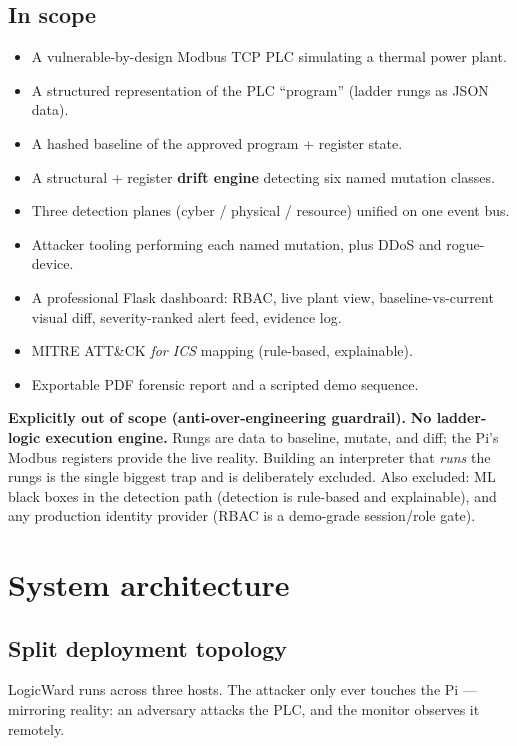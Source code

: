 \documentclass[11pt,a4paper]{article}
\begin{document}
\subsection{In scope}
\begin{itemize}[leftmargin=1.4em,itemsep=1pt]
  \item A vulnerable-by-design Modbus TCP PLC simulating a thermal power plant.
  \item A structured representation of the PLC ``program'' (ladder rungs as JSON data).
  \item A hashed baseline of the approved program + register state.
  \item A structural + register \textbf{drift engine} detecting six named mutation classes.
  \item Three detection planes (cyber / physical / resource) unified on one event bus.
  \item Attacker tooling performing each named mutation, plus DDoS and rogue-device.
  \item A professional Flask dashboard: RBAC, live plant view, baseline-vs-current visual diff,
        severity-ranked alert feed, evidence log.
  \item MITRE ATT\&CK \emph{for ICS} mapping (rule-based, explainable).
  \item Exportable PDF forensic report and a scripted demo sequence.
\end{itemize}

\begin{warnbox}
\textbf{Explicitly out of scope (anti-over-engineering guardrail).}
\textbf{No ladder-logic execution engine.} Rungs are data to baseline, mutate, and diff; the Pi's
Modbus registers provide the live reality. Building an interpreter that \emph{runs} the rungs is the
single biggest trap and is deliberately excluded. Also excluded: ML black boxes in the detection
path (detection is rule-based and explainable), and any production identity provider (RBAC is a
demo-grade session/role gate).
\end{warnbox}

\section{System architecture}

\subsection{Split deployment topology}
LogicWard runs across three hosts. The attacker only ever touches the Pi --- mirroring reality: an
adversary attacks the PLC, and the monitor observes it remotely.
\end{document}
